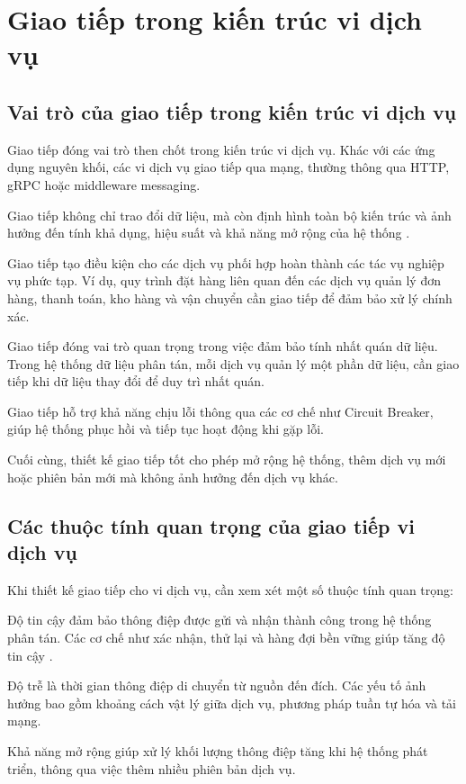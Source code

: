 \section{Giao tiếp trong kiến trúc vi dịch vụ}

\subsection{Vai trò của giao tiếp trong kiến trúc vi dịch vụ}
Giao tiếp đóng vai trò then chốt trong kiến trúc vi dịch vụ. Khác với các ứng
dụng nguyên khối, các vi dịch vụ giao tiếp qua mạng, thường thông qua HTTP, gRPC hoặc middleware messaging.

Giao tiếp không chỉ trao đổi dữ liệu, mà còn định hình toàn bộ kiến trúc và ảnh hưởng đến tính khả dụng, hiệu suất và khả năng mở rộng của hệ thống \cite{wolff2016}.

Giao tiếp tạo điều kiện cho các dịch vụ phối hợp hoàn thành các tác vụ nghiệp vụ phức tạp. Ví dụ, quy trình đặt hàng liên quan đến các dịch vụ quản lý đơn hàng, thanh toán, kho hàng và vận chuyển cần giao tiếp để đảm bảo xử lý chính xác.

Giao tiếp đóng vai trò quan trọng trong việc đảm bảo tính nhất quán dữ liệu. Trong hệ thống dữ liệu phân tán, mỗi dịch vụ quản lý một phần dữ liệu, cần giao tiếp khi dữ liệu thay đổi để duy trì nhất quán.

Giao tiếp hỗ trợ khả năng chịu lỗi thông qua các cơ chế như Circuit Breaker, giúp hệ thống phục hồi và tiếp tục hoạt động khi gặp lỗi.

Cuối cùng, thiết kế giao tiếp tốt cho phép mở rộng hệ thống, thêm dịch vụ mới hoặc phiên bản mới mà không ảnh hưởng đến dịch vụ khác.

\subsection{Các thuộc tính quan trọng của giao tiếp vi dịch vụ}
Khi thiết kế giao tiếp cho vi dịch vụ, cần xem xét một số thuộc tính quan trọng:

Độ tin cậy đảm bảo thông điệp được gửi và nhận thành công trong hệ thống phân tán. Các cơ chế như xác nhận, thử lại và hàng đợi bền vững giúp tăng độ tin cậy \cite{hohpe2004}.

Độ trễ là thời gian thông điệp di chuyển từ nguồn đến đích. Các yếu tố ảnh hưởng bao gồm khoảng cách vật lý giữa dịch vụ, phương pháp tuần tự hóa và tải mạng.

Khả năng mở rộng giúp xử lý khối lượng thông điệp tăng khi hệ thống phát triển, thông qua việc thêm nhiều phiên bản dịch vụ.


